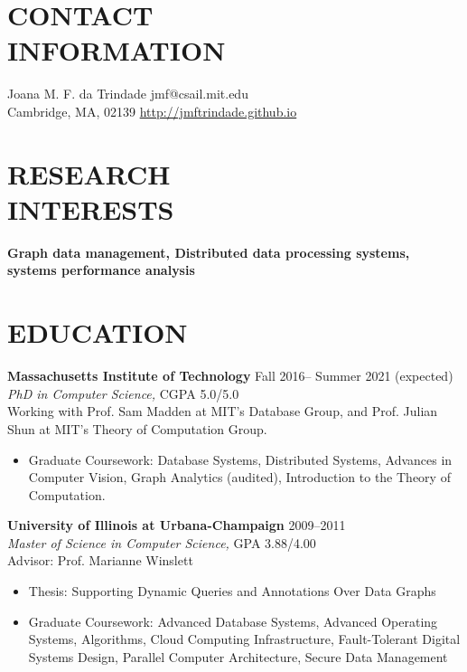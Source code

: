 \documentclass[line,margin]{res}
\begin{document}
 
\begin{resume}
 
\section{CONTACT \\ INFORMATION}  Joana M. F. da Trindade \hfill jmf@csail.mit.edu \\
               Cambridge, MA, 02139 \hfill \url{http://jmftrindade.github.io}

\section{RESEARCH \\ INTERESTS}       \textbf{Graph data management, Distributed data processing systems, systems performance analysis}
 
\section{EDUCATION} \textbf{Massachusetts Institute of Technology} \hfill Fall
  2016-- Summer 2021 (expected) \\
                {\sl PhD in Computer Science,} CGPA 5.0/5.0 \\
                Working with Prof. Sam Madden at MIT's Database Group, and Prof. Julian Shun at MIT's Theory of Computation Group.
                \begin{itemize}  \itemsep -2pt
                    \item Graduate Coursework: Database Systems, Distributed
                      Systems, Advances in Computer Vision, Graph Analytics
                      (audited), Introduction to the Theory of Computation.
                \end{itemize}

                \textbf{University of Illinois at Urbana-Champaign} \hfill 2009--2011 \\
                {\sl Master of Science in Computer Science,}  GPA 3.88/4.00 \\
                Advisor: Prof. Marianne Winslett
                \begin{itemize}  \itemsep -2pt
                \item  Thesis: Supporting Dynamic Queries and Annotations Over Data Graphs
                \item Graduate Coursework: Advanced Database Systems, Advanced Operating Systems, Algorithms, Cloud Computing Infrastructure, Fault-Tolerant Digital Systems Design, Parallel Computer Architecture, Secure Data Management
                \end{itemize}


\end{resume}
\end{document}

